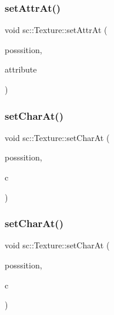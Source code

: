 \mbox{\label{classsc_1_1_texture_ad66375bc4380afdb3949c336bb8e66ac}} 
\subsubsection{\texorpdfstring{setAttrAt()}{setAttrAt()}}
{\footnotesize\ttfamily void sc\+::\+Texture\+::set\+Attr\+At (\begin{DoxyParamCaption}\item[{const \mbox{\hyperlink{classsc_1_1_vector2_d}{Vector2D}} \&}]{posssition,  }\item[{const W\+O\+RD \&}]{attribute }\end{DoxyParamCaption})}

\mbox{\label{classsc_1_1_texture_ad1d266797c9546b642479c875a6800c6}} 
\subsubsection{\texorpdfstring{setCharAt()}{setCharAt()}\hspace{0.1cm}{\footnotesize\ttfamily [1/2]}}
{\footnotesize\ttfamily void sc\+::\+Texture\+::set\+Char\+At (\begin{DoxyParamCaption}\item[{const \mbox{\hyperlink{classsc_1_1_vector2_d}{Vector2D}} \&}]{posssition,  }\item[{const char \&}]{c }\end{DoxyParamCaption})}

\mbox{\label{classsc_1_1_texture_a98f9795abab95f2e99fa8a22d4d13a7b}} 
\subsubsection{\texorpdfstring{setCharAt()}{setCharAt()}\hspace{0.1cm}{\footnotesize\ttfamily [2/2]}}
{\footnotesize\ttfamily void sc\+::\+Texture\+::set\+Char\+At (\begin{DoxyParamCaption}\item[{const \mbox{\hyperlink{classsc_1_1_vector2_d}{Vector2D}} \&}]{posssition,  }\item[{const wchar\+\_\+t \&}]{c }\end{DoxyParamCaption})}

